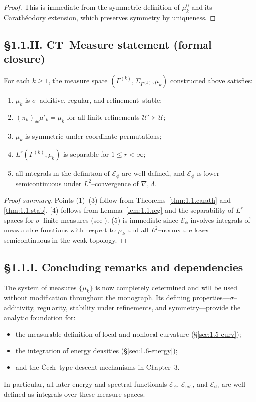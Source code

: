 \begin{proof}
This is immediate from the symmetric definition of $\mu_k^0$ and its Carathéodory extension, which preserves symmetry by uniqueness.
\end{proof}

\subsection*{§1.1.H. CT–Measure statement (formal closure)}

\begin{theorem}\label{ct:1.1.measure}
For each $k\ge1$, the measure space $(\Gamma^{(k)},\Sigma_{\Gamma^{(k)}},\mu_k)$ constructed above satisfies:
\begin{enumerate}
  \item $\mu_k$ is $\sigma$–additive, regular, and refinement–stable;
  \item $(\pi_k)_\#\mu'_k=\mu_k$ for all finite refinements $\mathcal U'\succ\mathcal U$;
  \item $\mu_k$ is symmetric under coordinate permutations;
  \item $L^r(\Gamma^{(k)},\mu_k)$ is separable for $1\le r<\infty$;
  \item all integrals in the definition of $\mathcal E_\phi$ are well-defined, and $\mathcal E_\phi$ is lower semicontinuous under $L^2$–convergence of $\nabla,\Lambda$.
\end{enumerate}
\end{theorem}

\begin{proof}[Proof summary]
Points (1)–(3) follow from Theorems~\ref{thm:1.1.carath} and \ref{thm:1.1.stab}. 
(4) follows from Lemma~\ref{lem:1.1.reg} and the separability of $L^r$ spaces for $\sigma$–finite measures (see \cite[§5.4]{Bogachev1}). 
(5) is immediate since $\mathcal E_\phi$ involves integrals of measurable functions with respect to $\mu_k$ and all $L^2$–norms are lower semicontinuous in the weak topology.
\end{proof}

\subsection*{§1.1.I. Concluding remarks and dependencies}
The system of measures $\{\mu_k\}$ is now completely determined and will be used without modification throughout the monograph.
Its defining properties—$\sigma$–additivity, regularity, stability under refinements, and symmetry—provide the analytic foundation for:
\begin{itemize}
  \item the measurable definition of local and nonlocal curvature (\S\ref{sec:1.5-curv});
  \item the integration of energy densities (\S\ref{sec:1.6-energy});
  \item and the Čech–type descent mechanisms in Chapter~3.
\end{itemize}
In particular, all later energy and spectral functionals $\mathcal E_\phi$, $\mathcal E_{\mathrm{ext}}$, and $\mathcal E_{\mathrm{sh}}$ are well-defined as integrals over these measure spaces.

